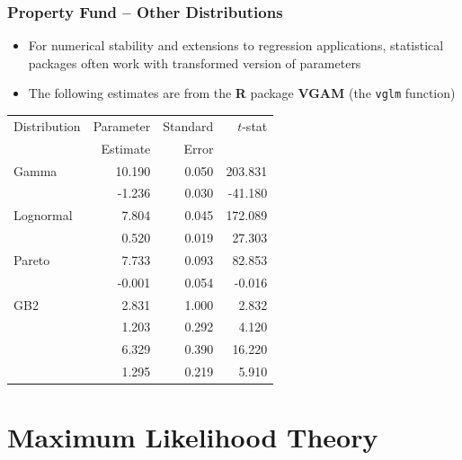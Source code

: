 \documentclass{beamer}
\begin{document}
\begin{frame}[shrink=2]
\frametitle{Property Fund -- Other Distributions}
\begin{itemize}
\item For numerical stability and extensions to regression applications, statistical packages often work with transformed version of parameters
\item The following estimates are from the \textbf{R} package \textbf{VGAM} (the {\tt{vglm}} function)
\end{itemize}
\begin{center}
\begin{tabular}{l|rrr}\hline
Distribution &    Parameter & Standard & $t$-stat  \\
            & Estimate & Error & \\\hline
Gamma       &     10.190 &      0.050 &    203.831 \\
            &     -1.236 &      0.030 &    -41.180 \\
Lognormal   &      7.804 &      0.045 &    172.089 \\
            &      0.520 &      0.019 &     27.303 \\
Pareto     &      7.733 &      0.093 &     82.853 \\
           &     -0.001 &      0.054 &     -0.016 \\
GB2        &      2.831 &      1.000 &      2.832 \\
           &      1.203 &      0.292 &      4.120 \\
           &      6.329 &      0.390 &     16.220 \\
           &      1.295 &      0.219 &      5.910 \\\hline
\end{tabular}
\end{center}
\end{frame}



\section{Maximum Likelihood Theory}
\end{document}
